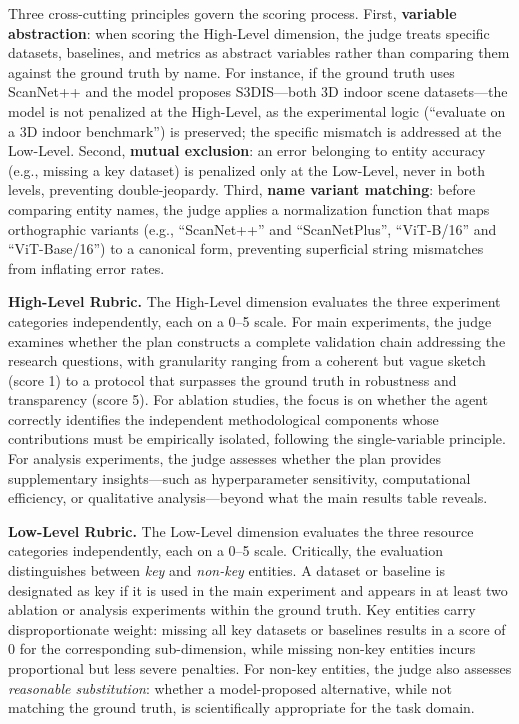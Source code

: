 \smallskip
Three cross-cutting principles govern the scoring process. First, \textbf{variable abstraction}: when scoring the High-Level dimension, the judge treats specific datasets, baselines, and metrics as abstract variables rather than comparing them against the ground truth by name. For instance, if the ground truth uses ScanNet++ and the model proposes S3DIS---both 3D indoor scene datasets---the model is not penalized at the High-Level, as the experimental logic (``evaluate on a 3D indoor benchmark'') is preserved; the specific mismatch is addressed at the Low-Level. Second, \textbf{mutual exclusion}: an error belonging to entity accuracy (e.g., missing a key dataset) is penalized only at the Low-Level, never in both levels, preventing double-jeopardy. Third, \textbf{name variant matching}: before comparing entity names, the judge applies a normalization function that maps orthographic variants (e.g., ``ScanNet++'' and ``ScanNetPlus'', ``ViT-B/16'' and ``ViT-Base/16'') to a canonical form, preventing superficial string mismatches from inflating error rates.

\smallskip
\textbf{High-Level Rubric.} The High-Level dimension evaluates the three experiment categories independently, each on a 0--5 scale. For main experiments, the judge examines whether the plan constructs a complete validation chain addressing the research questions, with granularity ranging from a coherent but vague sketch (score 1) to a protocol that surpasses the ground truth in robustness and transparency (score 5). For ablation studies, the focus is on whether the agent correctly identifies the independent methodological components whose contributions must be empirically isolated, following the single-variable principle. For analysis experiments, the judge assesses whether the plan provides supplementary insights---such as hyperparameter sensitivity, computational efficiency, or qualitative analysis---beyond what the main results table reveals.

\smallskip
\textbf{Low-Level Rubric.} The Low-Level dimension evaluates the three resource categories independently, each on a 0--5 scale. Critically, the evaluation distinguishes between \textit{key} and \textit{non-key} entities. A dataset or baseline is designated as key if it is used in the main experiment and appears in at least two ablation or analysis experiments within the ground truth. Key entities carry disproportionate weight: missing all key datasets or baselines results in a score of 0 for the corresponding sub-dimension, while missing non-key entities incurs proportional but less severe penalties. For non-key entities, the judge also assesses \textit{reasonable substitution}: whether a model-proposed alternative, while not matching the ground truth, is scientifically appropriate for the task domain.

